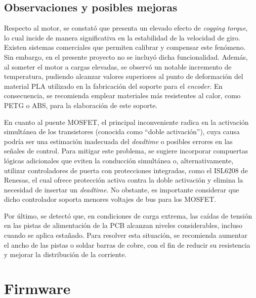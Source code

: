 \documentclass[11pt]{report}
\begin{document}


\newpage
\section{Observaciones y posibles mejoras}

Respecto al motor, se constató que presenta un elevado efecto de \emph{cogging torque}, lo cual incide de manera significativa en la estabilidad de la velocidad de giro. Existen sistemas comerciales que permiten calibrar y compensar este fenómeno. Sin embargo, en el presente proyecto no se incluyó dicha funcionalidad. Además, al someter el motor a cargas elevadas, se observó un notable incremento de temperatura, pudiendo alcanzar valores superiores al punto de deformación del material PLA utilizado en la fabricación del soporte para el \emph{encoder}. En consecuencia, se recomienda emplear materiales más resistentes al calor, como PETG o ABS, para la elaboración de este soporte.

En cuanto al puente MOSFET, el principal inconveniente radica en la activación simultánea de los transistores (conocida como “doble activación”), cuya causa podría ser una estimación inadecuada del \emph{deadtime} o posibles errores en las señales de control. Para mitigar este problema, se sugiere incorporar compuertas lógicas adicionales que eviten la conducción simultánea o, alternativamente, utilizar controladores de puerta con protecciones integradas, como el ISL6208 de Renesas, el cual ofrece protección activa contra la doble activación y elimina la necesidad de insertar un \emph{deadtime}. No obstante, es importante considerar que dicho controlador soporta menores voltajes de bus para los MOSFET.

Por último, se detectó que, en condiciones de carga extrema, las caídas de tensión en las pistas de alimentación de la PCB alcanzan niveles considerables, incluso cuando se aplica estañado. Para resolver esta situación, se recomienda aumentar el ancho de las pistas o soldar barras de cobre, con el fin de reducir su resistencia y mejorar la distribución de la corriente.

\newpage
\chapter{Firmware}
\end{document}

